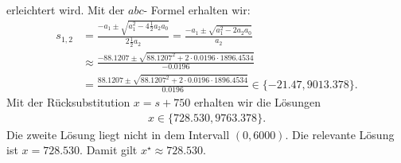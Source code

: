 erleichtert wird. Mit der $abc$- Formel erhalten wir:
\begin{align*}
	s_{1,2}
	&=
	\frac{-a_1 \pm \sqrt{a_1^2 - 4 \frac{1}{2} a_2 a_0}}{2 \frac{1}{2} a_2}
	=
	\frac{-a_1 \pm \sqrt{a_1^2 - 2  a_2 a_0}}{ a_2} \\
	&\approx
	\frac{-88.1207 \pm \sqrt{88.1207^2 + 2 \cdot 0.0196 \cdot 1896.4534}}{-0.0196}\\
	&=
	\frac{88.1207 \pm \sqrt{88.1207^2 + 2 \cdot 0.0196 \cdot 1896.4534}}{0.0196}
	\in 
	\{ -21.47, 9013.378\}.
\end{align*}
Mit der Rücksubstitution $x = s + 750$ erhalten wir die Lösungen 
\begin{align*}
	x
	\in 
	\{
	728.530,9763.378
	\}.
\end{align*}
Die zweite Lösung liegt nicht in dem Intervall $(0,6000)$. Die relevante Lösung ist $x = 728.530$. Damit gilt $x^\star \approx 728.530$.


\newpage
